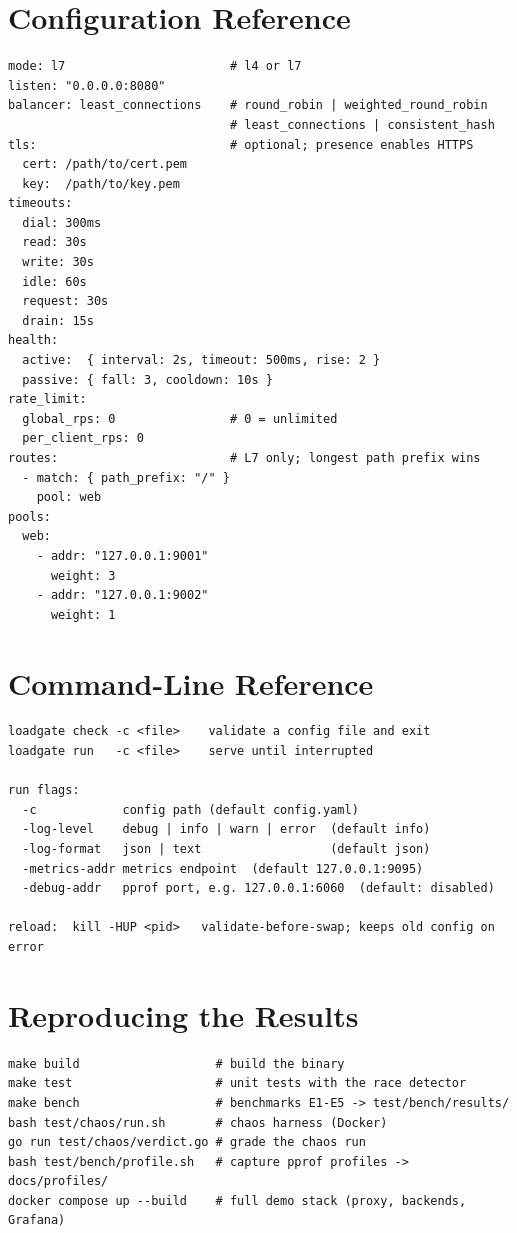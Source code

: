 \documentclass[11pt,a4paper]{report}
\begin{document}
\appendix
\chapter{Configuration Reference}
\begin{lstlisting}
mode: l7                       # l4 or l7
listen: "0.0.0.0:8080"
balancer: least_connections    # round_robin | weighted_round_robin
                               # least_connections | consistent_hash
tls:                           # optional; presence enables HTTPS
  cert: /path/to/cert.pem
  key:  /path/to/key.pem
timeouts:
  dial: 300ms
  read: 30s
  write: 30s
  idle: 60s
  request: 30s
  drain: 15s
health:
  active:  { interval: 2s, timeout: 500ms, rise: 2 }
  passive: { fall: 3, cooldown: 10s }
rate_limit:
  global_rps: 0                # 0 = unlimited
  per_client_rps: 0
routes:                        # L7 only; longest path prefix wins
  - match: { path_prefix: "/" }
    pool: web
pools:
  web:
    - addr: "127.0.0.1:9001"
      weight: 3
    - addr: "127.0.0.1:9002"
      weight: 1
\end{lstlisting}

\chapter{Command-Line Reference}
\begin{lstlisting}
loadgate check -c <file>    validate a config file and exit
loadgate run   -c <file>    serve until interrupted

run flags:
  -c            config path (default config.yaml)
  -log-level    debug | info | warn | error  (default info)
  -log-format   json | text                  (default json)
  -metrics-addr metrics endpoint  (default 127.0.0.1:9095)
  -debug-addr   pprof port, e.g. 127.0.0.1:6060  (default: disabled)

reload:  kill -HUP <pid>   validate-before-swap; keeps old config on error
\end{lstlisting}

\chapter{Reproducing the Results}
\begin{lstlisting}
make build                   # build the binary
make test                    # unit tests with the race detector
make bench                   # benchmarks E1-E5 -> test/bench/results/
bash test/chaos/run.sh       # chaos harness (Docker)
go run test/chaos/verdict.go # grade the chaos run
bash test/bench/profile.sh   # capture pprof profiles -> docs/profiles/
docker compose up --build    # full demo stack (proxy, backends, Grafana)
\end{lstlisting}
\end{document}

